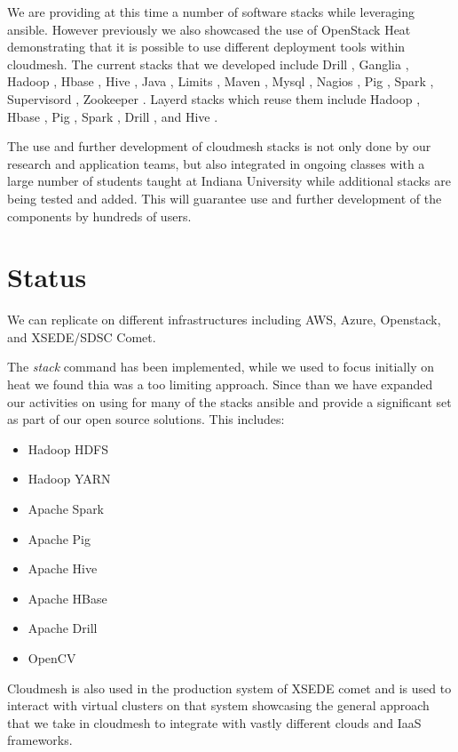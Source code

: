 We are providing at this time a number of software stacks while
leveraging ansible. However previously we also showcased the use of
OpenStack Heat demonstrating that it is possible to use different
deployment tools within cloudmesh.  The current stacks that we
developed include Drill \cite{??}, Ganglia \cite{??}, Hadoop
\cite{??}, Hbase \cite{??}, Hive \cite{??}, Java \cite{??}, Limits
\cite{??}, Maven \cite{??}, Mysql \cite{??}, Nagios \cite{??}, Pig
\cite{??}, Spark \cite{??}, Supervisord \cite{??}, Zookeeper
\cite{??}. Layerd stacks which reuse them include Hadoop \cite{??},
Hbase \cite{??}, Pig \cite{??}, Spark \cite{??}, Drill \cite{??}, and
Hive \cite{??}.

The use and further development of cloudmesh stacks is not only done
by our research and application teams, but also integrated in ongoing
classes with a large number of students taught at Indiana University
while additional stacks are being tested and added. This will guarantee 
use and further development of the components by hundreds of users.



\section{Status}


We can replicate on different infrastructures including AWS, Azure,
Openstack, and XSEDE/SDSC Comet.

The {\it stack} command has been implemented, while we used to focus initially
on heat we found thia was a too limiting approach. Since than we have
expanded our activities on using for many of the stacks ansible and
provide a significant set as part of our open source solutions. This
includes:

\begin{itemize}
\item Hadoop HDFS
\item Hadoop YARN
\item Apache Spark
\item Apache Pig
\item Apache Hive
\item Apache HBase
\item Apache Drill
\item OpenCV
\end{itemize}

Cloudmesh is also used in the production system of XSEDE comet and is
used to interact with virtual clusters on that system showcasing the
general approach that we take in cloudmesh to integrate with vastly
different clouds and IaaS frameworks.

